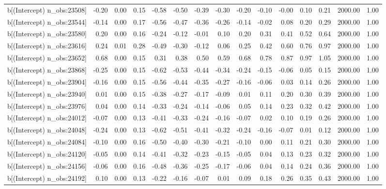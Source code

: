 \begin{table}[ht]
\begin{tabular}{rrrrrrrrrrrrrrr}
  b[(Intercept) n\_obs:23508] & -0.20 & 0.00 & 0.15 & -0.58 & -0.50 & -0.39 & -0.30 & -0.20 & -0.10 & -0.00 & 0.10 & 0.21 & 2000.00 & 1.00 \\ 
  b[(Intercept) n\_obs:23544] & -0.14 & 0.00 & 0.17 & -0.56 & -0.47 & -0.36 & -0.26 & -0.14 & -0.02 & 0.08 & 0.20 & 0.29 & 2000.00 & 1.00 \\ 
  b[(Intercept) n\_obs:23580] & 0.20 & 0.00 & 0.16 & -0.24 & -0.12 & -0.01 & 0.10 & 0.20 & 0.31 & 0.41 & 0.52 & 0.64 & 2000.00 & 1.00 \\ 
  b[(Intercept) n\_obs:23616] & 0.24 & 0.01 & 0.28 & -0.49 & -0.30 & -0.12 & 0.06 & 0.25 & 0.42 & 0.60 & 0.76 & 0.97 & 2000.00 & 1.00 \\ 
  b[(Intercept) n\_obs:23652] & 0.68 & 0.00 & 0.15 & 0.31 & 0.38 & 0.50 & 0.59 & 0.68 & 0.78 & 0.87 & 0.97 & 1.05 & 2000.00 & 1.00 \\ 
  b[(Intercept) n\_obs:23868] & -0.25 & 0.00 & 0.15 & -0.62 & -0.53 & -0.44 & -0.34 & -0.24 & -0.15 & -0.06 & 0.05 & 0.15 & 2000.00 & 1.00 \\ 
  b[(Intercept) n\_obs:23904] & -0.16 & 0.00 & 0.15 & -0.56 & -0.44 & -0.35 & -0.27 & -0.16 & -0.06 & 0.03 & 0.14 & 0.26 & 2000.00 & 1.00 \\ 
  b[(Intercept) n\_obs:23940] & 0.01 & 0.00 & 0.15 & -0.38 & -0.27 & -0.17 & -0.09 & 0.01 & 0.11 & 0.20 & 0.30 & 0.39 & 2000.00 & 1.00 \\ 
  b[(Intercept) n\_obs:23976] & 0.04 & 0.00 & 0.14 & -0.33 & -0.24 & -0.14 & -0.06 & 0.05 & 0.14 & 0.23 & 0.32 & 0.42 & 2000.00 & 1.00 \\ 
  b[(Intercept) n\_obs:24012] & -0.07 & 0.00 & 0.13 & -0.41 & -0.33 & -0.24 & -0.16 & -0.07 & 0.02 & 0.10 & 0.19 & 0.26 & 2000.00 & 1.00 \\ 
  b[(Intercept) n\_obs:24048] & -0.24 & 0.00 & 0.13 & -0.62 & -0.51 & -0.41 & -0.32 & -0.24 & -0.16 & -0.07 & 0.01 & 0.12 & 2000.00 & 1.00 \\ 
  b[(Intercept) n\_obs:24084] & -0.10 & 0.00 & 0.16 & -0.50 & -0.40 & -0.30 & -0.21 & -0.10 & 0.00 & 0.11 & 0.21 & 0.30 & 2000.00 & 1.00 \\ 
  b[(Intercept) n\_obs:24120] & -0.05 & 0.00 & 0.14 & -0.41 & -0.32 & -0.23 & -0.15 & -0.05 & 0.04 & 0.13 & 0.23 & 0.32 & 2000.00 & 1.00 \\ 
  b[(Intercept) n\_obs:24156] & -0.06 & 0.00 & 0.16 & -0.48 & -0.36 & -0.25 & -0.17 & -0.06 & 0.04 & 0.14 & 0.24 & 0.36 & 2000.00 & 1.00 \\ 
  b[(Intercept) n\_obs:24192] & 0.10 & 0.00 & 0.13 & -0.22 & -0.16 & -0.07 & 0.01 & 0.09 & 0.18 & 0.26 & 0.35 & 0.43 & 2000.00 & 1.00 \\ 

\end{tabular}
\end{table}
